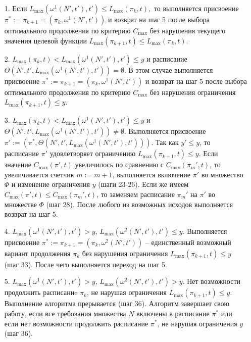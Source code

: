 \begin{itemize}
\item[1.] Если $L_{\max}(\omega^1(N', t'),t') \leq L_{\max}(\pi_k,t),$ то выполняется присвоение $\pi^* := \pi_{k+1} =(\pi_k, \omega^1(N', t'))$ и возврат на шаг 5 после выбора оптимального продолжения по критерию $C_{\max}$ без нарушения текущего значения целевой функции $L_{\max}(\pi_{k+1},t) \leq L_{\max}(\pi_k,t)$.
\item[2.] $L_{\max}(\pi_k,t) < L_{\max}(\omega^1(N', t'),t') \leq y$ и расписание $\Theta(N', t', L_{\max}(\omega^1(N', t'), t')) = \emptyset$. В этом случае выполняется присвоение $\pi^* := \pi_{k+1} = (\pi_k, \omega^1(N', t'))$ и возврат на шаг 5 после выбора оптимального продолжения по критерию $C_{\max}$ без нарушения ограничения $L_{\max}(\pi_{k+1},t) \leq y$.
\item[3.] $L_{\max}(\pi_k,t) < L_{\max}(\omega^1(N', t'),t') \leq y$ и $\Theta(N', t', L_{\max}(\omega^1(N', t'), t')) \neq \emptyset$. Выполняется присвоение $\pi' := (\pi^*, \Theta(N', t', L_{\max}(\omega^1(N', t'), t')))$. Так как $y' \leq y$, то расписание $\pi'$ удовлетворяет ограничению $L_{\max}(\pi_{k+1},t) \leq  y$. Если значение $C_{\max}(\pi',t)$  увеличилось по сравнению с $C_{\max}(\pi_m',t)$, то увеличивается счетчик $m:=m+1$, выполняется включение $\pi'$ во множество $\Phi$ и изменение ограничения $y$ (шаги 23-26). Если же имеем $C_{\max}(\pi',t) \leq C_{\max}(\pi_m',t)$, то заменяем расписание $\pi_m'$ на $\pi'$ во множестве $\Phi$ (шаг 28). После любого из возможных исходов выполняется возврат на шаг 5.
\item[4.] $L_{\max}(\omega^1(N', t'),t') > y $, $L_{\max}(\omega^2(N', t'),t') \leq y.$ Выполняется присвоение $\pi^* := \pi_{k+1} = (\pi_k, \omega^2(N', t'))$ -- единственный возможный вариант продолжения $\pi_k$ без нарушения ограничения $L_{\max}(\pi_{k+1},t) \leq  y$ (шаг 33). После чего выполняется переход на шаг 5.
\item[5.] $L_{\max}(\omega^1(N', t'),t') > y $, $L_{\max}(\omega^2(N', t'),t') > y.$ Нет возможности продолжить расписаниe $\pi_k$, не нарушая ограничения $L_{\max}(\pi_{k+1},t) \leq y$. Выполнение алгоритма прерывается (шаг 36).
Алгоритм завершает свою работу, если все требования множества $N$ включены в расписание $\pi^*$ или если нет возможности продолжить расписание $\pi^*$, не нарушая ограничения $y$ (шаг 36).
\end{itemize}
